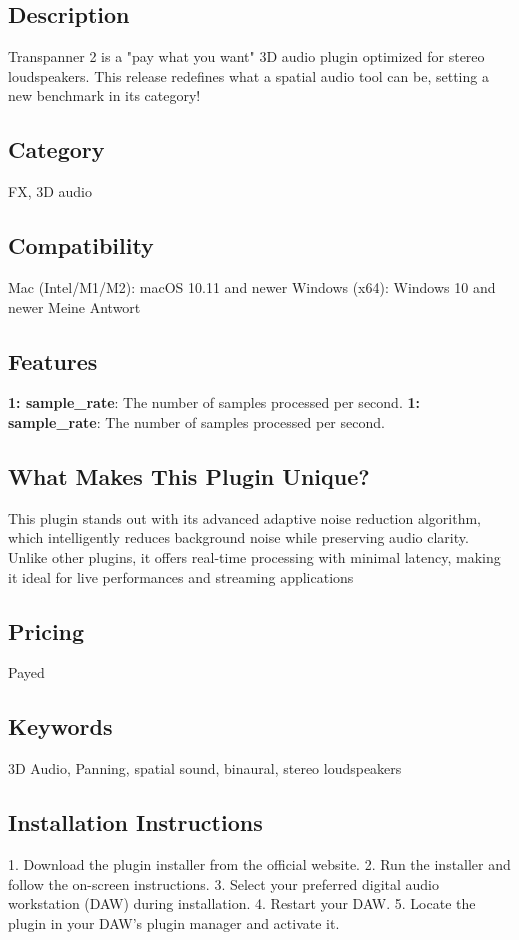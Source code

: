 \documentclass[8pt]{article}
\begin{document}
    \subsection*{Description}
    Transpanner 2 is a "pay what you want" 3D audio plugin optimized for stereo loudspeakers. This release redefines what a spatial audio tool can be, setting a new benchmark in its category!

    \subsection*{Category}
    FX, 3D audio

    \subsection*{Compatibility}
    Mac (Intel/M1/M2): macOS 10.11 and newer
Windows (x64): Windows 10 and newer
Meine Antwort


    \subsection*{Features}
    \textbf{1: sample\_rate}: The number of samples processed per second.
\textbf{1: sample\_rate}: The number of samples processed per second.

    \subsection*{What Makes This Plugin Unique?}
    This plugin stands out with its advanced adaptive noise reduction algorithm, which intelligently reduces background noise while preserving audio clarity. Unlike other plugins, it offers real-time processing with minimal latency, making it ideal for live performances and streaming applications

    \subsection*{Pricing}
    Payed

    \subsection*{Keywords}
    3D Audio, Panning, spatial sound, binaural, stereo loudspeakers

    \subsection*{Installation Instructions}
    1. Download the plugin installer from the official website.
2. Run the installer and follow the on-screen instructions.
3. Select your preferred digital audio workstation (DAW) during installation.
4. Restart your DAW.
5. Locate the plugin in your DAW’s plugin manager and activate it.
\end{document}
